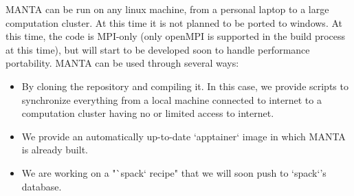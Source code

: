 MANTA can be run on any linux machine, from a personal laptop to a large computation cluster. At this time it is not planned to be ported to windows. At this time, the code is MPI-only (only openMPI is supported in the build process at this time), but will start to be developed soon to handle performance portability. MANTA can be used through several ways:
\begin{itemize}
    \item By cloning the repository and compiling it. In this case, we provide scripts to synchronize everything from a local machine connected to internet to a computation cluster having no or limited access to internet.
    \item We provide an automatically up-to-date `apptainer` image in which MANTA is already built.
    \item We are working on a "`spack` recipe" that we will soon push to `spack`'s database.
\end{itemize}

